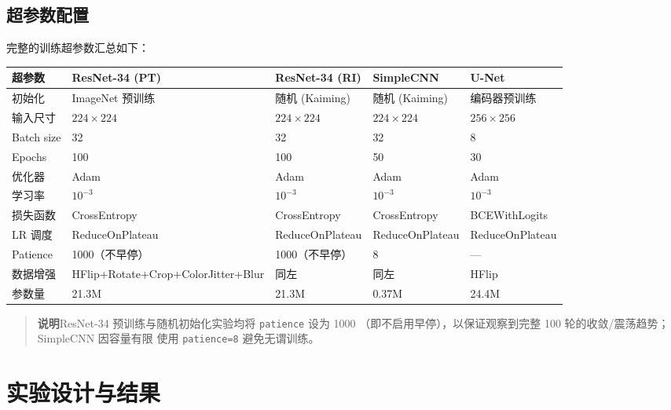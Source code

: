 \documentclass[12pt, a4paper, openany]{ctexbook}
\begin{document}
\section{超参数配置}

完整的训练超参数汇总如下：

\begin{center}
\footnotesize
\begin{tabular}{L{3cm}C{2.6cm}C{2.6cm}C{2.6cm}C{2.5cm}}
  \toprule
  \textbf{超参数} & \textbf{ResNet-34 (PT)} & \textbf{ResNet-34 (RI)} & \textbf{SimpleCNN} & \textbf{U-Net} \\
  \midrule
  初始化        & ImageNet 预训练 & 随机 (Kaiming) & 随机 (Kaiming) & 编码器预训练 \\
  输入尺寸      & $224 \times 224$ & $224 \times 224$ & $224 \times 224$ & $256 \times 256$ \\
  Batch size    & 32  & 32  & 32 & 8 \\
  Epochs        & 100 & 100 & 50 & 30 \\
  优化器        & Adam & Adam & Adam & Adam \\
  学习率        & $10^{-3}$ & $10^{-3}$ & $10^{-3}$ & $10^{-3}$ \\
  损失函数      & CrossEntropy & CrossEntropy & CrossEntropy & BCEWithLogits \\
  LR 调度       & ReduceOnPlateau & ReduceOnPlateau & ReduceOnPlateau & ReduceOnPlateau \\
  Patience      & 1000（不早停） & 1000（不早停） & 8 & --- \\
  数据增强      & HFlip+Rotate+Crop+ColorJitter+Blur & 同左 & 同左 & HFlip \\
  参数量        & 21.3M & 21.3M & 0.37M & 24.4M \\
  \bottomrule
\end{tabular}
\end{center}

\begin{quote}
\textbf{说明}\quad ResNet-34 预训练与随机初始化实验均将 \texttt{patience} 设为 1000
（即不启用早停），以保证观察到完整 100 轮的收敛/震荡趋势；SimpleCNN 因容量有限
使用 \texttt{patience=8} 避免无谓训练。
\end{quote}

\chapter{实验设计与结果}
\label{ch:experiment}
\end{document}
